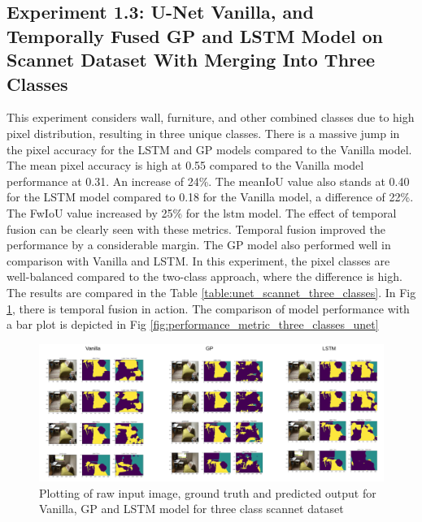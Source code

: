     \subsection{Experiment 1.3: U-Net Vanilla, and Temporally Fused GP and LSTM Model on Scannet Dataset With Merging Into Three Classes}
	
	This experiment considers wall, furniture, and other combined classes due to high pixel distribution, resulting in three unique classes. There is a massive jump in the pixel accuracy for the LSTM and GP models compared to the Vanilla model. The mean pixel accuracy is high at 0.55 compared to the Vanilla model performance at 0.31. An increase of 24\%. The meanIoU value also stands at 0.40 for the LSTM model compared to 0.18 for the Vanilla model, a difference of 22\%. The FwIoU value increased by 25\% for the lstm model. The effect of temporal fusion can be clearly seen with these metrics. Temporal fusion improved the performance by a considerable margin. The GP model also performed well in comparison with Vanilla and LSTM. In this experiment, the pixel classes are well-balanced compared to the two-class approach, where the difference is high. The results are compared in the Table \ref{table:unet_scannet_three_classes}. In Fig \ref{fig:performance_metric_three_classes_scannet}, there is temporal fusion in action. The comparison of model performance with a bar plot is depicted in Fig \ref{fig:performance_metric_three_classes_unet}
	
	\begin{figure}
		\centering
		\includegraphics[width=16cm]{images/unet_scannet_three_classes.png}
		\caption{Plotting of raw input image, ground truth and predicted output for Vanilla, GP and LSTM model for three class scannet dataset}
		\label{fig:performance_metric_three_classes_scannet}
	\end{figure}

